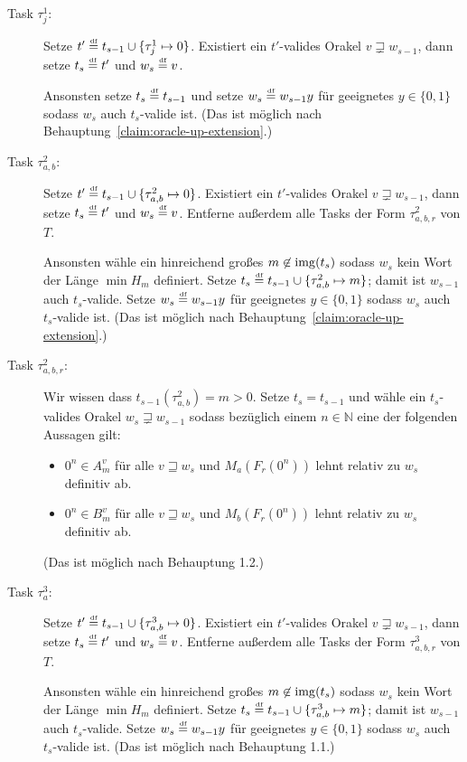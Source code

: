 \begin{description}
    \item[Task $\tau^1_j$:] Setze $t'\stackrel{\text{\smash{\tiny df}}}{=} t_{s-1}\cup\{\tau^1_j\mapsto 0\}$. Existiert ein $t'$-valides Orakel $v\sqsupsetneq w_{s-1}$, dann setze $t_s\stackrel{\text{\smash{\tiny df}}}{=} t'$ und $w_s\stackrel{\text{\smash{\tiny df}}}{=} v$.

        Ansonsten setze $t_s\stackrel{\text{\smash{\tiny df}}}{=} t_{s-1}$ und setze $w_s\stackrel{\text{\smash{\tiny df}}}{=} w_{s-1}y$ für geeignetes $y\in\{0,1\}$ sodass $w_s$ auch $t_s$-valide ist. (Das ist möglich nach Behauptung~\ref{claim:oracle-up-extension}.)

    \item[Task $\tau^2_{a,b}$:] Setze $t'\stackrel{\text{\smash{\tiny df}}}{=} t_{s-1}\cup\{\tau^2_{a,b}\mapsto 0\}$. Existiert ein $t'$-valides Orakel $v\sqsupsetneq w_{s-1}$, dann setze $t_s\stackrel{\text{\smash{\tiny df}}}{=} t'$ und $w_s\stackrel{\text{\smash{\tiny df}}}{=} v$. Entferne außerdem alle Tasks der Form $\tau^2_{a,b,r}$ von $T$.

        Ansonsten wähle ein hinreichend großes $m\not\in \operatorname{img}(t_s)$ sodass $w_s$ kein Wort der Länge $\min H_m$ definiert. Setze $t_s\stackrel{\text{\smash{\tiny df}}}{=} t_{s-1}\cup \{ \tau^2_{a,b}\mapsto m \}$; damit ist $w_{s-1}$ auch $t_s$-valide. Setze $w_s\stackrel{\text{\smash{\tiny df}}}{=} w_{s-1}y$ für geeignetes $y\in\{0,1\}$ sodass $w_s$ auch $t_s$-valide ist. (Das ist möglich nach Behauptung~\ref{claim:oracle-up-extension}.)

    \item[Task $\tau^2_{a,b,r}$:] Wir wissen dass $t_{s-1}(\tau^2_{a,b})=m>0$. Setze $t_s=t_{s-1}$ und wähle ein $t_s$-valides Orakel $w_s\sqsupsetneq w_{s-1}$ sodass bezüglich einem $n\in\mathbb N$ eine der folgenden Aussagen gilt:
        \begin{itemize}[nosep,endpenalty=10000]
            \item $0^n\in A_m^v$ für alle $v\sqsupseteq w_s$ und $M_a(F_r(0^n))$ lehnt relativ zu $w_s$ definitiv ab.
            \item $0^n\in B_m^v$ für alle $v\sqsupseteq w_s$ und $M_b(F_r(0^n))$ lehnt relativ zu $w_s$ definitiv ab.
        \end{itemize} (Das ist möglich nach Behauptung 1.2.)

    \item[Task $\tau^3_{a}$:] Setze $t'\stackrel{\text{\smash{\tiny df}}}{=} t_{s-1}\cup\{\tau^3_{a,b}\mapsto 0\}$. Existiert ein $t'$-valides Orakel $v\sqsupsetneq w_{s-1}$, dann setze $t_s\stackrel{\text{\smash{\tiny df}}}{=} t'$ und $w_s\stackrel{\text{\smash{\tiny df}}}{=} v$. Entferne außerdem alle Tasks der Form $\tau^3_{a,b,r}$ von $T$.

        Ansonsten wähle ein hinreichend großes $m\not\in \operatorname{img}(t_s)$ sodass $w_s$ kein Wort der Länge $\min H_m$ definiert. Setze $t_s\stackrel{\text{\smash{\tiny df}}}{=} t_{s-1}\cup \{ \tau^3_{a,b}\mapsto m \}$; damit ist $w_{s-1}$ auch $t_s$-valide. Setze $w_s\stackrel{\text{\smash{\tiny df}}}{=} w_{s-1}y$ für geeignetes $y\in\{0,1\}$ sodass $w_s$ auch $t_s$-valide ist. (Das ist möglich nach Behauptung 1.1.)


\end{description}
